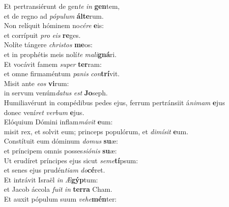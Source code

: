\oddverse Et pertransiérunt de gen\textit{te} \textit{in} \textbf{gen}tem,~\*\\
\oddverse et de regno ad \textit{pó}\textit{pu}\textit{lum} \textbf{ál}\textbf{te}rum.\\
\evenverse Non relíquit hóminem no\textit{cé}\textit{re} \textbf{e}is:~\*\\
\evenverse et corrípuit \textit{pro} \textit{e}\textit{is} \textbf{re}ges.\\
\oddverse Nolíte tángere \textit{chri}\textit{stos} \textbf{me}os:~\*\\
\oddverse et in prophétis meis nolí\textit{te} \textit{ma}\textit{li}\textbf{gná}ri.\\
\evenverse Et vocávit famem \textit{su}\textit{per} \textbf{ter}ram:~\*\\
\evenverse et omne firmaméntum \textit{pa}\textit{nis} \textit{con}\textbf{trí}vit.\\
\oddverse Misit ante \textit{e}\textit{os} \textbf{vi}rum:~\*\\
\oddverse in servum venúm\textit{da}\textit{tus} \textit{est} \textbf{Jo}seph.\\
\evenverse Humiliavérunt in compédibus pedes ejus, ferrum pertránsiit á\textit{ni}\textit{mam} \textbf{e}jus~\*\\
\evenverse donec vení\textit{ret} \textit{ver}\textit{bum} \textbf{e}jus.\\
\oddverse Elóquium Dómini inflam\textit{má}\textit{vit} \textbf{e}um:~\*\\
\oddverse misit rex, et solvit eum; princeps populórum, et \textit{di}\textit{mí}\textit{sit} \textbf{e}um.\\
\evenverse Constítuit eum dóminum \textit{do}\textit{mus} \textbf{su}æ:~\*\\
\evenverse et príncipem omnis posses\textit{si}\textit{ó}\textit{nis} \textbf{su}æ:\\
\oddverse Ut erudíret príncipes ejus sicut \textit{se}\textit{me}\textbf{tí}psum:~\*\\
\oddverse et senes ejus prudén\textit{ti}\textit{am} \textit{do}\textbf{cé}ret.\\
\evenverse Et intrávit Israël \textit{in} \textit{Æ}\textbf{gýp}tum:~\*\\
\evenverse et Jacob áccola \textit{fu}\textit{it} \textit{in} \textbf{ter}\textbf{ra} Cham.\\
\oddverse Et auxit pópulum suum \textit{ve}\textit{he}\textbf{mén}ter:~\*\\

